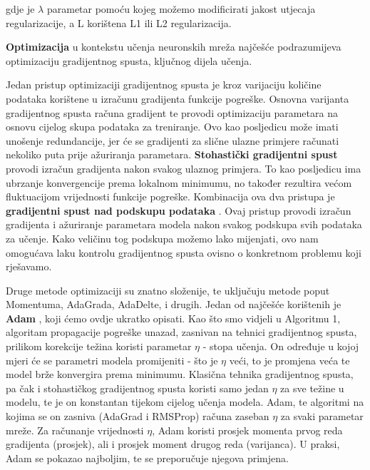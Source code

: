 \begin{myequation}%
\end{myequation}

gdje je $\lambda$ parametar pomoću kojeg možemo modificirati jakost utjecaja regularizacije, a L korištena L1 ili L2 regularizacija.\citep{optimizationAndRegularization}

\noindent \textbf{Optimizacija} u kontekstu učenja neuronskih mreža najčešće podrazumijeva optimizaciju gradijentnog spusta, ključnog dijela učenja.

Jedan pristup optimizaciji gradijentnog spusta je kroz varijaciju količine podataka korištene u izračunu gradijenta funkcije pogreške. Osnovna varijanta gradijentnog spusta računa gradijent te provodi optimizaciju parametara na osnovu cijelog skupa podataka za treniranje. Ovo kao posljedicu može imati unošenje redundancije, jer će se gradijenti za slične ulazne primjere računati nekoliko puta prije ažuriranja parametara. \textbf{Stohastički gradijentni spust} provodi izračun gradijenta nakon svakog ulaznog primjera. To kao posljedicu ima ubrzanje konvergencije prema lokalnom minimumu, no također rezultira većom fluktuacijom vrijednosti funkcije pogreške.
Kombinacija ova dva pristupa je \textbf{gradijentni spust nad podskupu podataka} . Ovaj pristup provodi izračun gradijenta i ažuriranje parametara modela nakon svakog podskupa svih podataka za učenje. Kako veličinu tog podskupa možemo lako mijenjati, ovo nam omogućava laku kontrolu gradijentnog spusta ovisno o konkretnom problemu koji rješavamo. \citep{gradientOptimizationAlgorithms}

Druge metode optimizaciji su znatno složenije, te uključuju metode poput Momentuma, AdaGrada, AdaDelte, i drugih. Jedan od najčešće korištenih je \textbf{Adam} , koji ćemo ovdje ukratko opisati. Kao što smo vidjeli u Algoritmu 1, algoritam propagacije pogreške unazad, zasnivan na tehnici gradijentnog spusta, prilikom korekcije težina koristi parametar $\eta$ - stopa učenja. On određuje u kojoj mjeri će se parametri modela promijeniti - što je $\eta$ veći, to je promjena veća te model brže konvergira prema minimumu. Klasična tehnika gradijentnog spusta, pa čak i stohastičkog gradijentnog spusta koristi samo jedan $\eta$ za sve težine u modelu, te je on konstantan tijekom cijelog učenja modela. Adam, te algoritmi na kojima se on zasniva (AdaGrad i RMSProp) računa zaseban $\eta$ za svaki parametar mreže. Za računanje vrijednosti $\eta$, Adam koristi prosjek momenta prvog reda gradijenta (prosjek), ali i prosjek moment drugog reda (varijanca). \citep{AdamMachineLearningMastery} U praksi, Adam se pokazao najboljim, te se preporučuje njegova primjena. \citep{gradientOptimizationAlgorithms}

